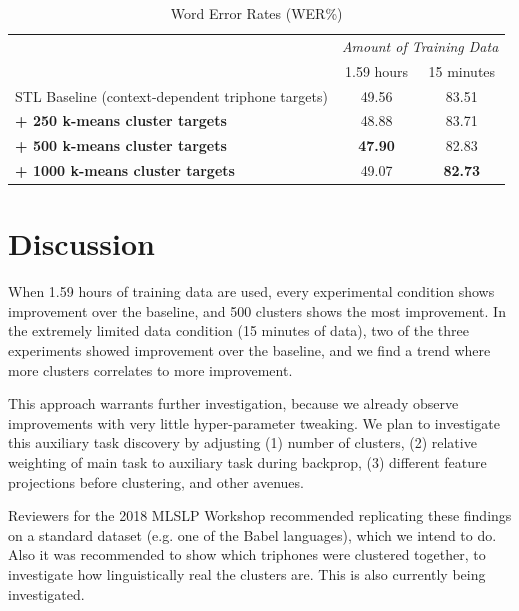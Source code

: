 \documentclass[a4paper]{article}
\begin{document}
\begin{table}[!htbp]
  \centering
  \caption{Word Error Rates (WER\%)}
    \label{tab:results}
  \begin{adjustbox}{width=.49\textwidth}
    \begin{tabular}{lcc}
      \toprule
      & \multicolumn{2}{c}{ \textit{Amount of Training Data}}\\
      & 1.59 hours & 15 minutes \\
      \midrule
      STL Baseline (context-dependent triphone targets)                            & 49.56       &  83.51 \\
      \textbf{+ 250 k-means cluster targets}        & 48.88            & 83.71 \\
      \textbf{+ 500 k-means cluster targets}        & \textbf{47.90}       & 82.83 \\
      \textbf{+ 1000 k-means cluster targets}        & 49.07       & \textbf{82.73} \\
      \midrule
      \bottomrule
    \end{tabular}
  \end{adjustbox}
\end{table}




\section{Discussion}


When 1.59 hours of training data are used, every experimental condition shows improvement over the baseline, and 500 clusters shows the most improvement. In the extremely limited data condition (15 minutes of data), two of the three experiments showed improvement over the baseline, and we find a trend where more clusters correlates to more improvement.

This approach warrants further investigation, because we already observe improvements with very little hyper-parameter tweaking. We plan to investigate this auxiliary task discovery by adjusting (1) number of clusters, (2) relative weighting of main task to auxiliary task during backprop, (3) different feature projections before clustering, and other avenues.

Reviewers for the 2018 MLSLP Workshop recommended replicating these findings on a standard dataset (e.g. one of the Babel languages), which we intend to do. Also it was recommended to show which triphones were clustered together, to investigate how linguistically real the clusters are. This is also currently being investigated. 
\end{document}
